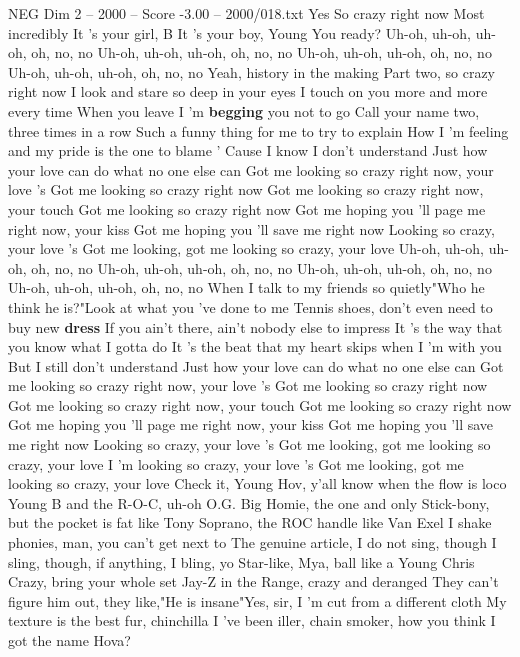 \begin{textsample}{NEG Dim 2 – 2000 – Score -3.00 – 2000/018.txt}  \label{ex:f2_neg_033}
Yes So crazy right now Most incredibly It 's your girl, B It 's your boy, Young You ready?
Uh-oh, uh-oh, uh-oh, oh, no, no Uh-oh, uh-oh, uh-oh, oh, no, no Uh-oh, uh-oh, uh-oh, oh, no, no Uh-oh, uh-oh, uh-oh, oh, no, no Yeah, history in the making Part two, so crazy right now I look and stare so deep in your eyes I touch on you more and more every time When you leave I 'm \textbf{begging} you not to go Call your name two, three times in a row Such a funny thing for me to try to explain How I 'm feeling and my pride is the one to blame ' Cause I know I don't understand Just how your love can do what no one else can Got me looking so crazy right now, your love 's Got me looking so crazy right now Got me looking so crazy right now, your touch Got me looking so crazy right now Got me hoping you 'll page me right now, your kiss Got me hoping you 'll save me right now Looking so crazy, your love 's Got me looking, got me looking so crazy, your love Uh-oh, uh-oh, uh-oh, oh, no, no Uh-oh, uh-oh, uh-oh, oh, no, no Uh-oh, uh-oh, uh-oh, oh, no, no Uh-oh, uh-oh, uh-oh, oh, no, no When I talk to my friends so quietly"Who he think he is?"Look at what you 've done to me Tennis shoes, don't even need to buy new \textbf{dress} If you ain't there, ain't nobody else to impress It 's the way that you know what I gotta do It 's the beat that my heart skips when I 'm with you But I still don't understand Just how your love can do what no one else can Got me looking so crazy right now, your love 's Got me looking so crazy right now Got me looking so crazy right now, your touch Got me looking so crazy right now Got me hoping you 'll page me right now, your kiss Got me hoping you 'll save me right now Looking so crazy, your love 's Got me looking, got me looking so crazy, your love I 'm looking so crazy, your love 's Got me looking, got me looking so crazy, your love Check it, Young Hov, y'all know when the flow is loco Young B and the R-O-C, uh-oh O.G.
Big Homie, the one and only Stick-bony, but the pocket is fat like Tony Soprano, the ROC handle like Van Exel I shake phonies, man, you can't get next to The genuine article, I do not sing, though I sling, though, if anything, I bling, yo Star-like, Mya, ball like a Young Chris Crazy, bring your whole set Jay-Z in the Range, crazy and deranged They can't figure him out, they like,"He is insane"Yes, sir, I 'm cut from a different cloth My texture is the best fur, chinchilla I 've been iller, chain smoker, how you think I got the name Hova?

\end{textsample}
